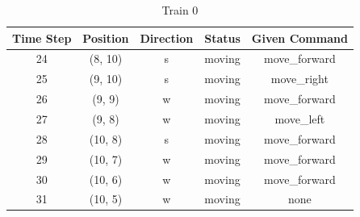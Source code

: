 \begin{table}
\centering
\caption{Train 0}
\label{tab:base0}
\begin{tabular}{c c c c c}
\hline
\textbf{Time Step} & \textbf{Position} & \textbf{Direction} & \textbf{Status} & \textbf{Given Command} \\
\hline
24 & (8, 10) & s & moving & move\_forward \\
25 & (9, 10) & s & moving & move\_right \\
26 & (9, 9) & w & moving & move\_forward \\
27 & (9, 8) & w & moving & move\_left \\
28 & (10, 8) & s & moving & move\_forward \\
29 & (10, 7) & w & moving & move\_forward \\
30 & (10, 6) & w & moving & move\_forward \\
31 & (10, 5) & w & moving & none \\
\hline
\end{tabular}
\end{table}